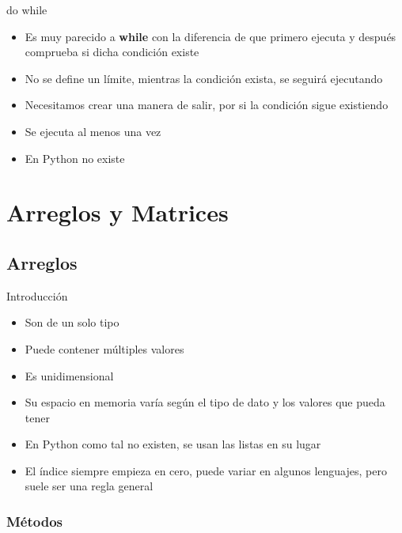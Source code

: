 \documentclass{beamer}
\begin{document}
\begin{frame}{do while}
    \begin{itemize}
            \item Es muy parecido a \textbf{while} con la diferencia de que primero ejecuta y despu\'es comprueba si dicha condici\'on existe
            \item No se define un l\'imite, mientras la condici\'on exista, se seguir\'a ejecutando
            \item Necesitamos crear una manera de salir, por si la condici\'on sigue existiendo
            \item Se ejecuta al menos una vez
            \item En Python no existe
        \end{itemize}
\end{frame}

\section{Arreglos  y Matrices}

\subsection{Arreglos}
\begin{frame}{Introducci\'on}
    \begin{itemize}
            \item Son de un solo tipo
            \item Puede contener m\'ultiples valores
            \item Es unidimensional
            \item Su espacio en memoria var\'ia seg\'un el tipo de dato y los valores que pueda tener
            \item En Python como tal no existen,  se usan las listas en su lugar
            \item El \'indice siempre empieza en cero, puede variar en algunos lenguajes, pero suele ser una regla general
        \end{itemize}
\end{frame}

\subsubsection{M\'etodos}
\end{document}
